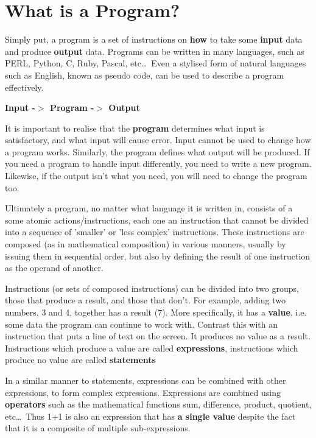 \section{What is a Program?}

Simply put, a program is a set of instructions on \textbf{how} to    take some \textbf{input} data and produce    \textbf{output} data. Programs can be written in many   languages, such as PERL, Python, C, Ruby, Pascal, etc\ldots\ Even a   stylised form of natural languages such as English, known as pseudo   code, can be used to describe a program effectively.

\begin{center}\textbf{Input -$>$ Program -$>$ Output}\end{center}

It is important to realise that the \textbf{program}   determines what input is satisfactory, and what input will cause error.   Input cannot be used to change how a program works. Similarly, the program   defines what output will be produced. If you need a program to handle   input differently, you need to write a new program. Likewise, if the   output isn't what you need, you will need to change the program too.

Ultimately a program, no matter what language it is written in,   consists of a some atomic actions/instructions, each one an instruction   that cannot be divided into a sequence of 'smaller' or 'less complex'   instructions. These instructions are composed (as in mathematical   composition) in various manners, usually by issuing them in sequential order,   but also by defining the result of one instruction as the operand of   another.

Instructions (or sets of composed instructions) can be divided into   two groups, those that produce a result, and those that   don't. For example, adding two numbers, 3 and 4, together has a result   (7). More specifically, it has a \textbf{value}, i.e. some data   the program can continue to work with. Contrast this with an   instruction that puts a line of text on the screen. It produces no   value as a result. Instructions which produce a value are called   \textbf{expressions}, instructions which produce no value are   called \textbf{statements}

In a similar manner to statements, expressions can be combined with   other expressions, to form complex expressions. Expressions are   combined using \textbf{operators} such as the mathematical   functions sum, difference, product, quotient, etc\ldots\ Thus 1+1 is also   an expression that has \textbf{a single value} despite the fact   that it is a composite of multiple sub-expressions.

